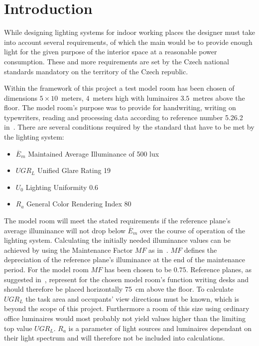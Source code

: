 \section{Introduction} \label{sec:intro}
While designing lighting systems for indoor working places the designer must take into account several requirements, of which the main would be to provide enough light for the given purpose of the interior space at a reasonable power consumption. These and more requirements are set by the Czech national standards \cite{12464} mandatory on the territory of the Czech republic.

Within the framework of this project a test model room has been chosen of dimensions $5 \times 10 $~meters, $4$~meters high with luminaires $3.5$~metres above the floor. The model room's purpose was to provide for handwriting, writing on typewriters, reading and processing data according to reference number 5.26.2 in~\cite{12464}. There are several conditions required by the standard that have to be met by the lighting system:


\begin{itemize}
	\item $\overline{E}_{m}$ Maintained Average Illuminance of 500 lux
	\item $UGR_{L}$ Unified Glare Rating 19
	\item $U_{0}$ Lighting Uniformity 0.6
	\item $R_{a}$ General Color Rendering Index 80
\end{itemize}

The model room will meet the stated requirements if the reference plane's average illuminance will not drop below $\overline{E}_{m}$ over the course of operation of the lighting system. Calculating the initially needed illuminance values can be achieved by using the Maintenance Factor $MF$ as in~\cite{CIE97}. $MF$ defines the depreciation of the reference plane's illuminance at the end of the maintenance period. For the model room $MF$ has been chosen to be $0.75$. Reference planes, as suggested in~\cite{12464}, represent for the chosen model room's function writing desks and should therefore be placed horizontally $75$~cm above the floor. To calculate $UGR_{L}$ the task area and occupants' view directions must be known, which is beyond the scope of this project. Furthermore a room of this size using ordinary office luminaires would most probably not yield values higher than the limiting top value $UGR_{L}$. $R_{a}$ is a parameter of light sources and luminaires dependant on their light spectrum and will therefore not be included into calculations.